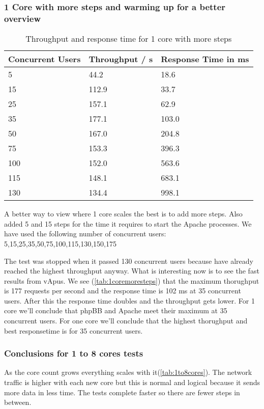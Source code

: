 \subsubsection{1 Core with more steps and warming up for a better overview}
\begin{wraptable}{r}{0.5\columnwidth}
\begin{centering}
\caption{Throughput and response time for 1 core with more steps}\label{tab:1coremoresteps}
\begin{tabular}{|p{2.2cm}|p{2.3cm}|p{2.3cm}|}\hline\rowcolor{myLightGreen}\arrayrulecolor{myLightGreen}
 {\bf\color{white} Concurrent Users} & {\bf\color{white} Throughput / s} & {\bf\color{white} Response Time in ms} \\ \hline 
 5 & 44.2 & 18.6 \\ \hline 
 15 & 112.9 & 33.7 \\ \hline \rowcolor{rowhighlight} 
 25 & 157.1 & 62.9 \\ \hline \rowcolor{rowhighlight}
 35 & 177.1 & 103.0 \\ \hline 
 50 & 167.0 & 204.8 \\ \hline 
 75 & 153.3 & 396.3 \\ \hline 
 100 & 152.0 & 563.6 \\ \hline 
 115 & 148.1 & 683.1 \\ \hline 
 130 & 134.4 & 998.1 \\ \hline 
\end{tabular}
\end{centering}
\end{wraptable}
A better way to view where 1 core scales the best is to add more steps. Also added 5 and 15 steps for the time it requires to start the Apache processes.  We have used the following number of concurrent users: 5,15,25,35,50,75,100,115,130,150,175

The test was stopped when it passed 130 concurrent users because have already reached the highest throughput anyway.
What is interesting now is to see the fast results from vApus.
We see (\autoref{tab:1coremoresteps}) that the maximum thorughput is 177 requests per second and the response time is 102 ms at 35 concurrent users. After this the response time doubles and the throughput gets lower. For 1 core we'll conclude that phpBB and Apache meet their maximum at 35 concurrent users.
For one core we'll conclude that the highest thorughput and best responsetime is for 35 concurrent users.

\subsubsection{Conclusions for 1 to 8 cores tests}
As the core count grows everything scales with it(\autoref{tab:1to8cores}). The network traffic is higher with each new core but this is normal and logical because it sends more data in less time. The tests complete faster so there are fewer steps in between. 

